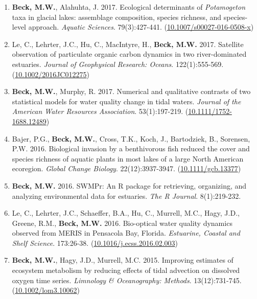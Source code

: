 \documentclass[letterpaper,12pt]{article}
\begin{document}
\begin{enumerate}
\item \textbf{Beck, M.W.}, Alahuhta, J. 2017. Ecological determinants of \textit{Potamogeton} taxa in glacial lakes: assemblage composition, species richness, and species-level approach. \textit{Aquatic Sciences}. 79(3):427-441. ({\footnotesize\href{https://doi.org/10.1007/s00027-016-0508-x}{10.1007/s00027-016-0508-x}})

\item Le, C., Lehrter, J.C., Hu, C., MacIntyre, H., \textbf{Beck, M.W.} 2017. Satellite observation of particulate organic carbon dynamics in two river-dominated estuaries. \textit{Journal of Geophysical Research: Oceans}. 122(1):555-569. ({\footnotesize\href{http://dx.doi.org/10.1002/2016JC012275}{10.1002/2016JC012275}})

\item \textbf{Beck, M.W.}, Murphy, R. 2017. Numerical and qualitative contrasts of two statistical models for water quality change in tidal waters. \textit{Journal of the American Water Resources Association}. 53(1):197-219. ({\footnotesize\href{http://dx.doi.org/10.1111/1752-1688.12489}{10.1111/1752-1688.12489}})

\item Bajer, P.G., \textbf{Beck, M.W.}, Cross, T.K., Koch, J., Bartodziek, B., Sorensen, P.W. 2016. Biological invasion by a benthivorous fish reduced the cover and species richness of aquatic plants in most lakes of a large North American ecoregion. \textit{Global Change Biology}. 22(12):3937-3947. ({\footnotesize\href{http://dx.doi.org/10.1111/gcb.13377}{10.1111/gcb.13377}})

\item \textbf{Beck, M.W.} 2016. SWMPr: An R package for retrieving, organizing, and analyzing environmental data for estuaries. \textit{The R Journal}. 8(1):219-232.

\item Le, C., Lehrter, J.C., Schaeffer, B.A., Hu, C., Murrell, M.C., Hagy, J.D., Greene, R.M., \textbf{Beck, M.W.} 2016. Bio-optical water quality dynamics observed from MERIS in Pensacola Bay, Florida. \textit{Estuarine, Coastal and Shelf Science}. 173:26-38. ({\footnotesize\href{https://doi.org/10.1016/j.ecss.2016.02.003}{10.1016/j.ecss.2016.02.003}})

\item \textbf{Beck, M.W.}, Hagy, J.D., Murrell, M.C. 2015. Improving estimates of ecosystem metabolism by reducing effects of tidal advection on dissolved oxygen time series. \textit{Limnology \& Oceanography: Methods}. 13(12):731-745. ({\footnotesize\href{http://dx.doi.org/10.1002/lom3.10062}{10.1002/lom3.10062}})


\end{enumerate}
\end{document}
